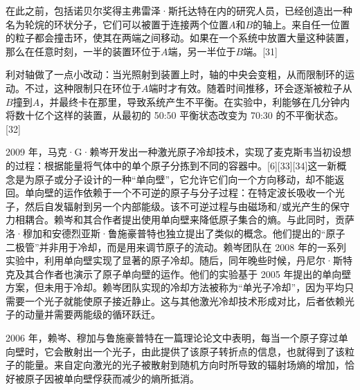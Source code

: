 在此之前，包括诺贝尔奖得主弗雷泽·斯托达特在内的研究人员，已经创造出一种名为轮烷的环状分子，它们可以被置于连接两个位置$A$和$B$的轴上。来自任一位置的粒子都会撞击环，使其在两端之间移动。如果在一个系统中放置大量这种装置，那么在任意时刻，一半的装置环位于$A$端，另一半位于$B$端。[31]

利对轴做了一点小改动：当光照射到装置上时，轴的中央会变粗，从而限制环的运动。不过，这种限制只在环位于$A$端时才有效。随着时间推移，环会逐渐被粒子从 $B$撞到$A$，并最终卡在那里，导致系统产生不平衡。在实验中，利能够在几分钟内将数十亿个这样的装置，从最初的 50:50 平衡状态改变为 70:30 的不平衡状态。[32]

2009 年，马克·G·赖岑开发出一种激光原子冷却技术，实现了麦克斯韦当初设想的过程：根据能量将气体中的单个原子分拣到不同的容器中。[6][33][34]这一新概念是为原子或分子设计的一种“单向壁”，它允许它们向一个方向移动，却不能返回。单向壁的运作依赖于一个不可逆的原子与分子过程：在特定波长吸收一个光子，然后自发辐射到另一个内部能级。该不可逆过程与由磁场和/或光产生的保守力相耦合。赖岑和其合作者提出使用单向壁来降低原子集合的熵。与此同时，贡萨洛·穆加和安德烈亚斯·鲁施豪普特也独立提出了类似的概念。他们提出的“原子二极管”并非用于冷却，而是用来调节原子的流动。赖岑团队在 2008 年的一系列实验中，利用单向壁实现了显著的原子冷却。随后，同年晚些时候，丹尼尔·斯特克及其合作者也演示了原子单向壁的运作。他们的实验基于 2005 年提出的单向壁方案，但未用于冷却。赖岑团队实现的冷却方法被称为“单光子冷却”，因为平均只需要一个光子就能使原子接近静止。这与其他激光冷却技术形成对比，后者依赖光子的动量并需要两能级的循环跃迁。

2006 年，赖岑、穆加与鲁施豪普特在一篇理论论文中表明，每当一个原子穿过单向壁时，它会散射出一个光子，由此提供了该原子转折点的信息，也就得到了该粒子的能量。来自定向激光的光子被散射到随机方向时所导致的辐射场熵的增加，恰好被原子因被单向壁俘获而减少的熵所抵消。
